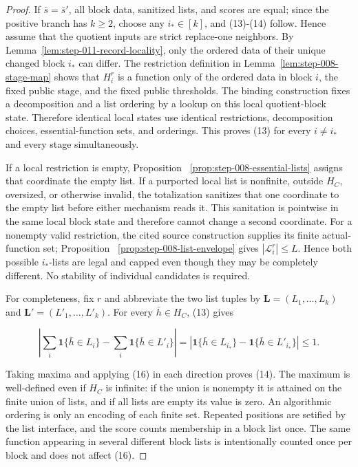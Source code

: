 \begin{proof}
If \(\bar s=\bar s'\), all block data, sanitized lists, and scores
are equal; since the positive branch has \(k\geq2\), choose any
\(i_*\in[k]\), and (13)-(14) follow. Hence assume that the quotient inputs
are strict replace-one neighbors. By
Lemma~\ref{lem:step-011-record-locality}, only the ordered data of their
unique changed block \(i_*\) can differ. The restriction definition in
Lemma~\ref{lem:step-008-stage-map} shows that \(H_i^r\) is a function only
of the ordered data in block \(i\), the fixed public stage, and the fixed
public thresholds. The binding construction fixes a
decomposition and a list ordering by a lookup on this local quotient-block
state. Therefore identical local states use identical restrictions,
decomposition choices, essential-function sets, and orderings. This proves
(13) for every \(i\ne i_*\) and every stage simultaneously.

If a local restriction is empty, Proposition
~\ref{prop:step-008-essential-lists} assigns that coordinate the empty
list. If a purported local list is nonfinite, outside \(H_C\), oversized, or
otherwise invalid, the  totalization sanitizes that one coordinate
to the empty list before either mechanism reads it. This sanitation is
pointwise in the same local block state and therefore cannot change a
second coordinate. For a nonempty valid restriction, the cited source
construction supplies its finite actual-function set; Proposition
~\ref{prop:step-008-list-envelope} gives
\(|\mathcal L_i^r|\le L\). Hence both possible
\(i_*\)-lists are legal and capped even though they may be completely
different. No stability of individual candidates is required.

For completeness, fix \(r\) and abbreviate the two list tuples by
\(\mathbf L=(L_1,\ldots,L_k)\) and
\(\mathbf L'=(L'_1,\ldots,L'_k)\). For every \(\bar h\in H_C\), (13) gives

\[
 \left|
  \sum_i\mathbf1\{\bar h\in L_i\}
  -\sum_i\mathbf1\{\bar h\in L'_i\}
 \right|
 =|\mathbf1\{\bar h\in L_{i_*}\}
   -\mathbf1\{\bar h\in L'_{i_*}\}|
 \leq1.
\tag{16}
\]

Taking maxima and applying (16) in each direction proves (14). The maximum
is well-defined even if \(H_C\) is infinite: if the union is nonempty it is
attained on the finite union of lists, and if all lists are empty its value
is zero. An algorithmic ordering is only an encoding of each finite set.
Repeated positions are setified by the  list interface, and the
score counts membership in a block list once. The same function appearing
in several different block lists is intentionally counted once per block
and does not affect (16).


\end{proof}
